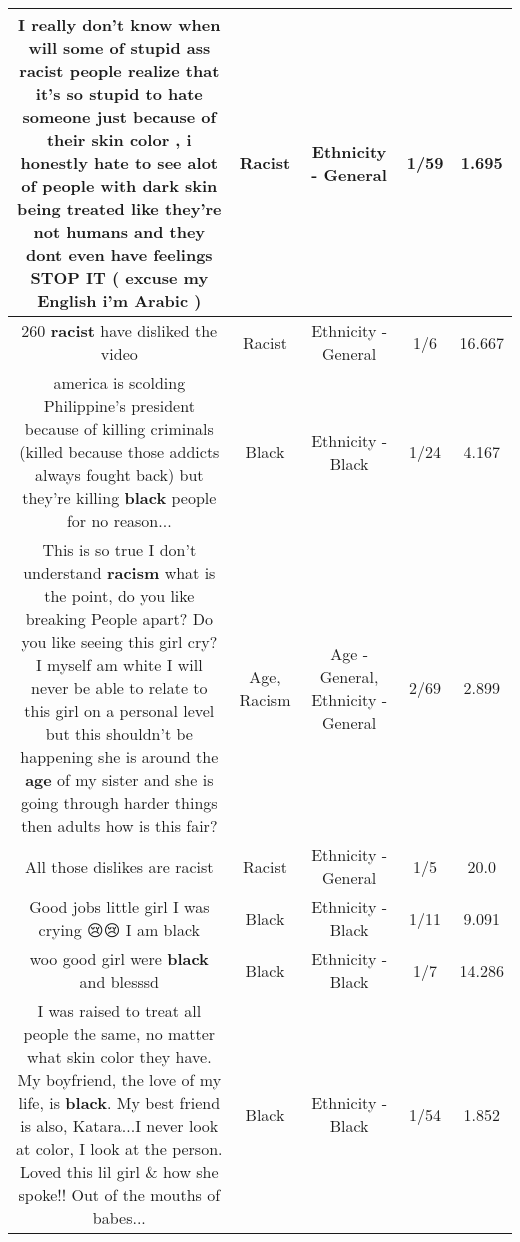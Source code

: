 \documentclass[11pt]{article}
\newlength\mylength
\begin{document}
\begin{center}
\begin{longtable}{|C{.65\mylength}|C{.30\mylength}|C{.12\mylength}|C{.12\mylength}|C{.12\mylength}|}
  \small I really don't know when will some of stupid ass  \textbf{racist} people realize that it's so stupid to hate someone just because of their skin color , i honestly hate to see alot of people with dark skin being treated like they're not humans and they dont even have feelings STOP IT ( excuse my English i'm Arabic )\normalsize   & Racist & Ethnicity - General & 1/59 & 1.695 \\  \hline
  \small 260 \textbf{racist} have disliked the video\normalsize   & Racist & Ethnicity - General & 1/6 & 16.667 \\  \hline
  \small america is scolding Philippine's president because of killing criminals (killed because those addicts always fought back) but they're killing \textbf{black} people for no reason...\normalsize   & Black & Ethnicity - Black & 1/24 & 4.167 \\  \hline
  \small This is so true I don't understand \textbf{racism} what is the point, do you like breaking People apart? Do you like seeing this girl cry? I myself am white I will never be able to relate to this girl on a personal level but this shouldn't be happening she is around the \textbf{age} of my sister and she is going through harder things then adults how is this fair?\normalsize   & Age, Racism & Age - General, Ethnicity - General & 2/69 & 2.899 \\  \hline
  \small All those dislikes are racist\normalsize   & Racist & Ethnicity - General & 1/5 & 20.0 \\  \hline
  \small Good jobs little girl I was crying 😢😢 I am black\normalsize   & Black & Ethnicity - Black & 1/11 & 9.091 \\  \hline
  \small woo good girl were \textbf{black} and blesssd\normalsize   & Black & Ethnicity - Black & 1/7 & 14.286 \\  \hline
  \small I was raised to treat all people the same, no matter what skin color they have.  My boyfriend, the love of my life, is \textbf{black}. My best friend is also, Katara...I never look at color, I look at the person. Loved this lil girl \& how she spoke!! Out of the mouths of babes...\normalsize   & Black & Ethnicity - Black & 1/54 & 1.852 \\  \hline

\end{longtable}
\end{center}
\end{document}
